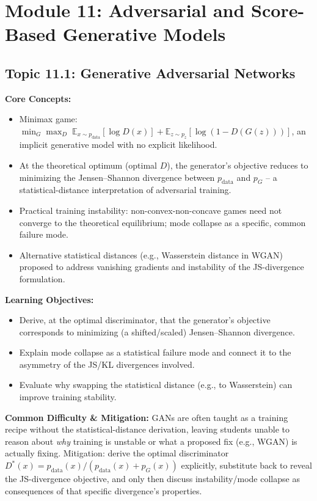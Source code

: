 \documentclass[11pt]{article}
\begin{document}
\section{Module 11: Adversarial and Score-Based Generative Models}

\subsection{Topic 11.1: Generative Adversarial Networks}

\textbf{Core Concepts:}
\begin{itemize}
  \item Minimax game: $\min_G \max_D \; \mathbb E_{x\sim p_{\text{data}}}[\log D(x)] + \mathbb E_{z\sim p_z}[\log(1-D(G(z)))]$, an implicit generative model with no explicit likelihood.
  \item At the theoretical optimum (optimal $D$), the generator's objective reduces to minimizing the Jensen--Shannon divergence between $p_{\text{data}}$ and $p_G$ -- a statistical-distance interpretation of adversarial training.
  \item Practical training instability: non-convex-non-concave games need not converge to the theoretical equilibrium; mode collapse as a specific, common failure mode.
  \item Alternative statistical distances (e.g., Wasserstein distance in WGAN) proposed to address vanishing gradients and instability of the JS-divergence formulation.
\end{itemize}

\textbf{Learning Objectives:}
\begin{itemize}
  \item Derive, at the optimal discriminator, that the generator's objective corresponds to minimizing (a shifted/scaled) Jensen--Shannon divergence.
  \item Explain mode collapse as a statistical failure mode and connect it to the asymmetry of the JS/KL divergences involved.
  \item Evaluate why swapping the statistical distance (e.g., to Wasserstein) can improve training stability.
\end{itemize}

\textbf{Common Difficulty \& Mitigation:} GANs are often taught as a training recipe without the statistical-distance derivation, leaving students unable to reason about \emph{why} training is unstable or what a proposed fix (e.g., WGAN) is actually fixing. Mitigation: derive the optimal discriminator $D^*(x) = p_{\text{data}}(x)/(p_{\text{data}}(x)+p_G(x))$ explicitly, substitute back to reveal the JS-divergence objective, and only then discuss instability/mode collapse as consequences of that specific divergence's properties.
\end{document}

